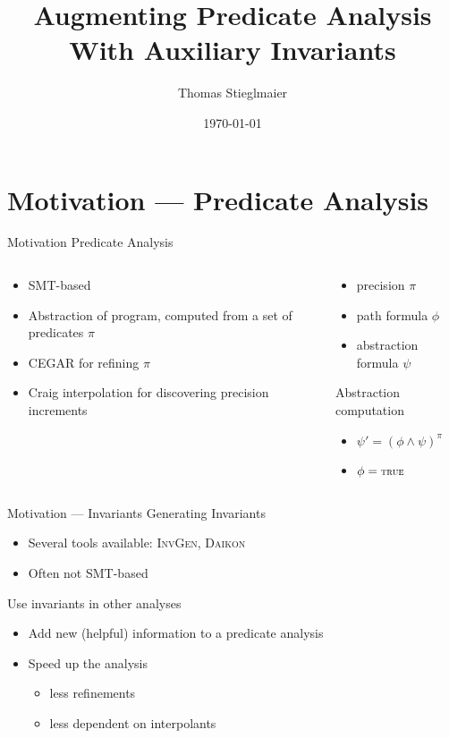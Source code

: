 \documentclass{beamer}
\title{Augmenting Predicate Analysis\\ With Auxiliary Invariants}
\date{\today}
\author{Thomas Stieglmaier}
\institute{University of Passau}
\newcommand{\true}{\text{\smaller{\textsc{true}}}}
\begin{document}
\maketitle
\section{Motivation --- Predicate Analysis}
\begin{frame}{Motivation}
      Predicate Analysis\\[1ex]
  \begin{columns}[T]
    \begin{column}{.5\textwidth}
      \begin{itemize}
	\item SMT-based
	\item Abstraction of program, computed from a set of predicates $\pi$
	\item CEGAR for refining $\pi$
	\item Craig interpolation for discovering precision increments
      \end{itemize}
    \end{column}
  \pause
    \begin{column}{0.5\textwidth}
 \begin{itemize}
    \item precision $\pi$
    \item path formula $\phi$
    \item abstraction formula $\psi$
 \end{itemize}
  Abstraction computation
  \begin{itemize}
    \item $\psi' = (\phi \land \psi)^\pi$
    \item $\phi = \true$
  \end{itemize}
    \end{column}
  \end{columns}
\end{frame}


\begin{frame}{Motivation --- Invariants}
        Generating Invariants\\[1ex]
      \begin{itemize}
        \item Several tools available: \textsc{InvGen}, \textsc{Daikon}
	\item Often not SMT-based
      \end{itemize}
	\pause
	Use invariants in other analyses
      \begin{itemize}
	\item Add new (helpful) information to a predicate analysis
	\item Speed up the analysis
	\begin{itemize}
	\item less refinements
	\item less dependent on interpolants
	\end{itemize}
      \end{itemize}
\end{frame}
\end{document}
